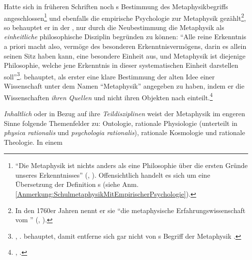 \begin{nummerierung}
Hatte sich  in früheren Schriften noch
s Bestimmung des
Metaphysikbegriffs angeschlossen\footnote{\enquote{Die Metaphysik ist nichts
anders als eine Philosophie über die ersten Gründe unseres Erkenntnisses}
\mkbibparens{\cite[][A
79]{Kant:UntersuchungueberdieDeutlichkeitderGrundsaetzedernatuerlichenTheologieundderMoral1977},
\cite[][II: 283.13--14]{Kant:GesammelteWerke1900ff.}}. Offensichtlich handelt es
sich um eine Übersetzung der Definition
s (siehe Anm. \ref{Anmerkung:SchulmetaphysikMitEmpirischerPsychologie}).}
und ebenfalls die empirische Psychologie zur Metaphysik gezählt\footnote{In den
1760er Jahren nennt er sie \enquote{die metaphysische Erfahrungswissenschaft vom
} \mkbibparens{\cite[][A
9]{Kant:NachrichtvonderEinrichtungseinerVorlesungenindemWinterhalbenjahrevon1765-17661900ff.},
\cite[][II: 309.2--3]{Kant:GesammelteWerke1900ff.}}.}, so behauptet er in der
, nur durch die Neubestimmung die Metaphysik
als \emph{einheitliche} philosophische Disziplin begründen zu können:
\enquote{Alle reine Erkenntnis a priori macht also, vermöge des besonderen
Erkenntnisvermögens, darin es allein seinen Sitz haben kann, eine besondere
Einheit aus, und Metaphysik ist diejenige Philosophie, welche jene Erkenntnis in
dieser systematischen Einheit darstellen
soll}\footnote{\cite[][B~873]{Kant:KritikderreinenVernunft2003}, \cite[][III:
546.8--11]{Kant:GesammelteWerke1900ff.}.
 behauptet, damit
entferne sich  gar nicht von
s Begriff der Metaphysik
\parencite[vgl.][\S~1]{Heidegger:KantunddasProblemderMetaphysik1965}.}.
 behauptet, als erster eine klare Bestimmung der alten Idee einer Wissenschaft unter dem Namen
\enquote{Metaphysik} angegeben zu haben, indem er die Wissenschaften \emph{ihren
Quellen} und nicht ihren Objekten nach einteilt.\footnote{\cite[Vgl.][B
870--873]{Kant:KritikderreinenVernunft2003}, \cite[][III:
544.25--546.15]{Kant:GesammelteWerke1900ff.}.}
%
%
\item\label{TeilDisziplinenDerMetaphysik} \textit{Inhaltlich} oder in Bezug auf
ihre \emph{Teildisziplinen} weist  der Metaphysik im
engeren Sinne folgende Themenfelder zu:
Ontologie, rationale Physiologie (unterteilt in \emph{physica rationalis} und
\emph{psychologia rationalis}), rationale Kosmologie und rationale Theologie. In einem

\end{nummerierung}
